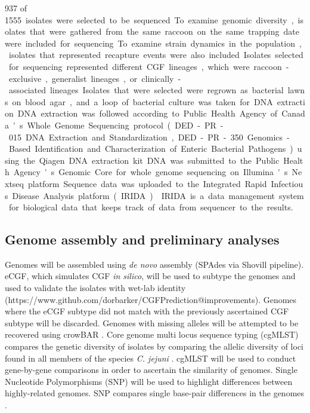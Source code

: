 \documentclass[letterpaper,titlepage,12pt]{article}
\begin{document}
937 of \SI{1555} isolates were selected to be sequenced. To examine genomic diversity, isolates that were gathered from the same raccoon on the same trapping date were included for sequencing. To examine strain dynamics in the population, isolates that represented recapture events were also included. Isolates selected for sequencing represented different CGF lineages, which were raccoon-exclusive, generalist lineages, or clinically-associated lineages. Isolates that were selected were regrown as bacterial lawns on blood agar, and a loop of bacterial culture was taken for DNA extraction. DNA extraction was followed according to Public Health Agency of Canada's Whole Genome Sequencing protocol (DED-PR-015 DNA Extraction and Standardization, DED-PR-350 Genomics-Based Identification and Characterization of Enteric Bacterial Pathogens) using the Qiagen DNA extraction kit.
DNA was submitted to the Public Health Agency's Genomic Core for whole genome sequencing on Illumina's Nextseq platform. Sequence data was uploaded to the Integrated Rapid Infectious Disease Analysis platform (IRIDA) \parencite{Matthews381830}. IRIDA is a data management system for biological data that keeps track of data from sequencer to the results.





\subsection{Genome assembly and preliminary analyses} %

Genomes will be assembled using \textit{de novo} assembly (SPAdes via Shovill pipeline). %
eCGF, which simulates CGF \textit{in silico}, will be used to subtype the genomes and used  to validate the isolates with wet-lab identity (https://www.github.com/dorbarker/CGFPrediction@improvements). Genomes where the eCGF subtype did not match with the previously ascertained CGF subtype will be discarded. Genomes with missing alleles will be attempted to be recovered using crowBAR \parencite{barker2018principles}. Core genome multi locus sequence typing (cgMLST) compares the genetic diversity of isolates by comparing the allelic diversity of loci found in all members of the species \textit{C. jejuni} \parencite{barker2018principles}. cgMLST will be used to%
conduct gene-by-gene comparisons in order to ascertain the similarity of genomes. Single Nucleotide Polymorphisms (SNP) will be used to highlight differences between highly-related genomes. SNP compares single base-pair differences in the genomes \parencite{petkau2017snvphyl}.
\end{document}

